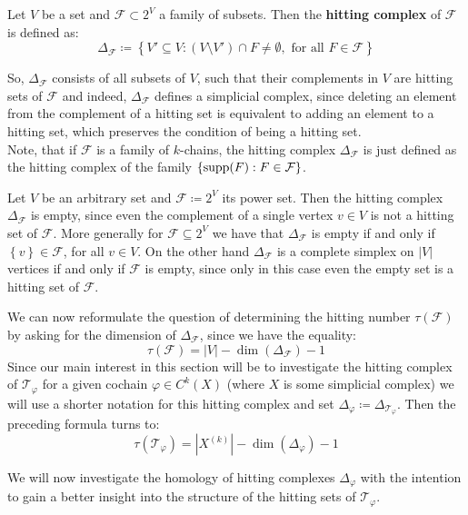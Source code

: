 \begin{defi}
Let \(V\) be a set and \(\mathcal{F}\subset 2^V\) a family of subsets. Then the \textbf{hitting complex} of \(\mathcal{F}\) is defined as:
\[
\Delta_{\mathcal{F}}\coloneqq \left\{V'\subseteq V:(V\setminus V')\cap F\neq\emptyset,\text{ for all }F\in\mathcal{F}\right\}
\]
\end{defi}
So, \(\Delta_{\mathcal{F}}\) consists of all subsets of \(V\), such that their complements in \(V\) are hitting sets of \(\mathcal{F}\) and indeed, \(\Delta_{\mathcal{F}}\) defines a simplicial complex, since deleting an element from the complement of a hitting set is equivalent to adding an element to a hitting set, which preserves the condition of being a hitting set.\\
Note, that if \(\mathcal{F}\) is a family of \(k\)-chains, the hitting complex \(\Delta_{\mathcal{F}}\) is just defined as the hitting complex of the family \(\{\mathrm{supp}(F):F\in\mathcal{F}\}\).

\begin{expl}
Let \(V\) be an arbitrary set and \(\mathcal{F}\coloneqq 2^V\) its power set. Then the hitting complex \(\Delta_{\mathcal{F}}\) is empty, since even the complement of a single vertex \(v\in V\) is not a hitting set of \(\mathcal{F}\). More generally for \(\mathcal{F}\subseteq 2^V\) we have that \(\Delta_{\mathcal{F}}\) is empty if and only if \(\left\{v\right\}\in\mathcal{F}\), for all \(v\in V\). On the other hand \(\Delta_{\mathcal{F}}\) is a complete simplex on \(\left|V\right|\) vertices if and only if \(\mathcal{F}\) is empty, since only in this case even the empty set is a hitting set of \(\mathcal{F}\).
\end{expl}

We can now reformulate the question of determining the hitting number \(\tau(\mathcal{F})\) by asking for the dimension of \(\Delta_{\mathcal{F}}\), since we have the equality:
\[
\tau(\mathcal{F})=\left| V\right|-\dim(\Delta_{\mathcal{F}})-1
\]
Since our main interest in this section will be to investigate the hitting complex of \(\mathcal{T}_{\varphi}\) for a given cochain \(\varphi\in C^k(X)\) (where \(X\) is some simplicial complex) we will use a shorter notation for this hitting complex and set \(\Delta_{\varphi}\coloneqq \Delta_{\mathcal{T}_{\varphi}}\). Then the preceding formula turns to:
\[
\tau(\mathcal{T}_{\varphi})=|X^{(k)}|-\dim(\Delta_{\varphi})-1
\]

We will now investigate the homology of hitting complexes \(\Delta_{\varphi}\) with the intention to gain a better insight into the structure of the hitting sets of \(\mathcal{T}_{\varphi}\).

